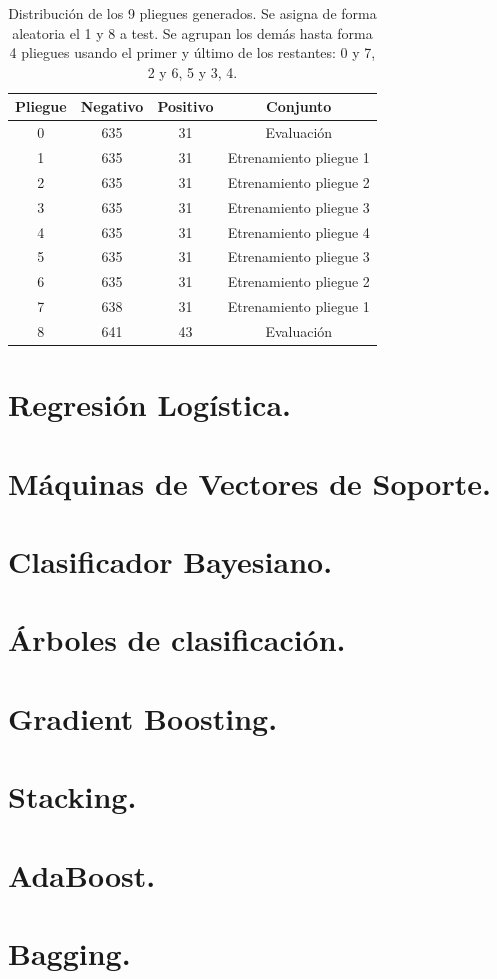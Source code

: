 \documentclass[12pt,letterpaper]{article}
\begin{document}
\begin{table}[htp]
    \centering
    \begin{tabular}{|c|c|c|c|}
    \hline
    \textbf{Pliegue} & \textbf{Negativo} & \textbf{Positivo} & \textbf{Conjunto}\\ \hline
    0 & 635 & 31 & Evaluación \\ \hline
    1 & 635 & 31 & Etrenamiento pliegue 1 \\ \hline
    2 & 635 & 31 & Etrenamiento pliegue 2\\ \hline
        3 & 635 & 31 & Etrenamiento pliegue 3\\ \hline
        4 & 635 & 31 & Etrenamiento pliegue 4\\ \hline
        5 & 635 & 31 & Etrenamiento pliegue 3\\ \hline
        6 & 635 & 31 & Etrenamiento pliegue 2 \\ \hline
        7 & 638 & 31 & Etrenamiento pliegue 1\\ \hline
        8 & 641 & 43 & Evaluación \\ \hline
    \end{tabular}
    \caption{Distribución de los 9 pliegues generados. Se asigna de forma aleatoria el 1 y 8 a test. Se agrupan los demás hasta forma 4 pliegues usando el primer y último de los restantes: 0 y 7, 2 y 6, 5 y 3, 4.}
    \label{tab:ValidacionCruzada}
\end{table}

\section{Regresión Logística.}
\section{Máquinas de Vectores de Soporte.}
\section{Clasificador Bayesiano.}
\section{Árboles de clasificación.}
\section{Gradient Boosting.}
\section{Stacking.}
\section{AdaBoost.}
\section{Bagging.}
\printbibliography
\end{document}
